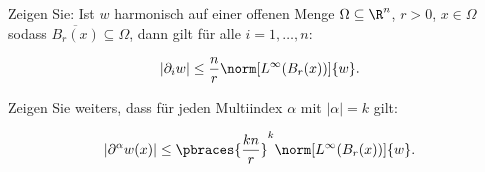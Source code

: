 
\begin{exercise}

Zeigen Sie:
Ist $w$ harmonisch auf einer offenen Menge $\Omega \subseteq \R^n$, $r > 0$, $x \in \Omega$ sodass $\overline{B_r(x)} \subseteq \Omega$, dann gilt für alle $i = 1, \dots, n:$

\begin{align*}
    |\partial_i w|
    \leq
    \frac{n}{r}
    \norm[L^\infty(B_r(x))]{w}.
\end{align*}

Zeigen Sie weiters, dass für jeden Multiindex $\alpha$ mit $|\alpha| = k$ gilt:

\begin{align*}
    |\partial^\alpha w(x)|
    \leq
    \pbraces
    {
        \frac{kn}{r}
    }^k
    \norm[L^\infty(B_r(x))]{w}.
\end{align*}

\end{exercise}


